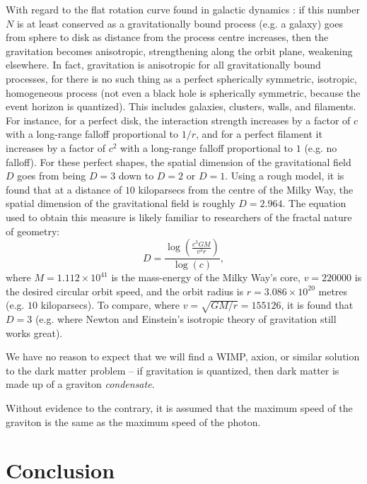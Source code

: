 \documentclass[12pt]{article}
\begin{document}
{With regard to the flat rotation curve found in galactic dynamics \cite{binney}: if this number $N$ is at least conserved as a gravitationally bound process (e.g. a galaxy) goes from sphere to disk as distance from the process centre increases, then the gravitation becomes anisotropic, strengthening along the orbit plane, weakening elsewhere.
In fact, gravitation is anisotropic for all gravitationally bound processes, for there is no such thing as a perfect spherically symmetric, isotropic, homogeneous process (not even a black hole is spherically symmetric, because the event horizon is quantized).
This includes galaxies, clusters, walls, and filaments.
For instance, for a perfect disk, the interaction strength increases by a factor of $c$ with a long-range falloff proportional to $1/r$, and for a perfect filament it increases by a factor of $c^2$ with a long-range falloff proportional to $1$ (e.g. no falloff).
For these perfect shapes, the spatial dimension of the gravitational field $D$ goes from being $D = 3$ down to $D = 2$ or $D = 1$.
Using a rough model, it is found that at a distance of $10$ kiloparsecs from the centre of the Milky Way, the spatial dimension of the gravitational field is roughly $D = 2.964$.
The equation used to obtain this measure is likely familiar to researchers of the fractal nature of geometry:
\begin{equation}
D = \frac{ \log\left(\frac{c^3 G M}{ v^2 r } \right)} { \log(c) },
\end{equation}
where $M = 1.112 \times 10^{41}$ is the mass-energy of the Milky Way's core, $v = 220000$ is the desired circular orbit speed, and the orbit radius is $r = 3.086 \times 10^{20}$ metres (e.g. $10$ kiloparsecs).
To compare, where $v = \sqrt{GM/r} = 155126$, it is found that $D = 3$ (e.g. where Newton and Einstein's isotropic theory of gravitation still works great).

We have no reason to expect that we will find a WIMP, axion, or similar solution \cite{berger, aalbers, quiskamp, haipeng, hui, ackerman} to the dark matter problem -- if gravitation is quantized, then dark matter is made up of a graviton {\textit{condensate}}.

Without evidence to the contrary, it is assumed that the maximum speed of the graviton is the same as the maximum speed of the photon.






\section{Conclusion}

}
\end{document}
